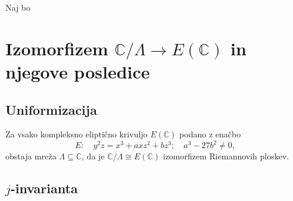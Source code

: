 \documentclass[mat1]{fmfdelo}
\numberwithin{equation}{section}
\newcommand{\C}{\mathbb C}
\newcommand{\torus}{\C/\Lambda}
\theoremstyle{definition}
\begin{document}
\begin{trditev}
    Naj bo 
\end{trditev}








\newpage
\section{Izomorfizem \texorpdfstring{$\C/\Lambda \to E(\C)$}{} in njegove posledice} \label{poglavje izomorfizem}

\subsection{Uniformizacija}

\begin{izrek}
    \label{uniformizacija}
    Za vsako kompleksno eliptično krivuljo $E(\C)$ podano z enačbo
    \[
        E: \quad y^2z = x^3 + axz^2 + bz^3; \quad a^3 - 27b^2 \neq 0,  
    \]
    obstaja mreža $\Lambda \subseteq \C$, da je $\torus \cong E(\C)$ izomorfizem Riemannovih ploskev. 
\end{izrek}

\subsection{$j$-invarianta}
 
\end{document}
